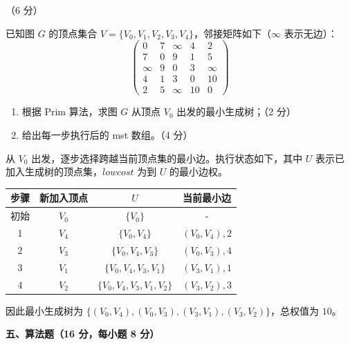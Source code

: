 \begin{question}[Prim算法求最小生成树]（6 分）

已知图 $G$ 的顶点集合 $V=\{V_0,V_1,V_2,V_3,V_4\}$，邻接矩阵如下（$\infty$ 表示无边）：
\[
\begin{pmatrix}
0 & 7 & \infty & 4 & 2\\
7 & 0 & 9 & 1 & 5\\
\infty & 9 & 0 & 3 & \infty\\
4 & 1 & 3 & 0 & 10\\
2 & 5 & \infty & 10 & 0
\end{pmatrix}
\]

\begin{enumerate}[label=\arabic*)]
  \item 根据 Prim 算法，求图 $G$ 从顶点 $V_0$ 出发的最小生成树；（2 分）
  \item 给出每一步执行后的 mst 数组。（4 分）
\end{enumerate}

\begin{solution}
从 $V_0$ 出发，逐步选择跨越当前顶点集的最小边。执行状态如下，其中 $U$ 表示已加入生成树的顶点集，$lowcost$ 为到 $U$ 的最小边权。
\begin{center}
\small
\begin{tabular}{c c c c}
\toprule
步骤 & 新加入顶点 & $U$ & 当前最小边 \\ 
\midrule
初始 & $V_0$ & $\{V_0\}$ & - \\ 
1 & $V_4$ & $\{V_0,V_4\}$ & $(V_0,V_4),2$ \\ 
2 & $V_3$ & $\{V_0,V_4,V_3\}$ & $(V_0,V_3),4$ \\ 
3 & $V_1$ & $\{V_0,V_4,V_3,V_1\}$ & $(V_3,V_1),1$ \\ 
4 & $V_2$ & $\{V_0,V_4,V_3,V_1,V_2\}$ & $(V_3,V_2),3$ \\ 
\bottomrule
\end{tabular}
\end{center}
因此最小生成树为 $\{(V_0,V_4),(V_0,V_3),(V_3,V_1),(V_3,V_2)\}$，总权值为 $10$。
\end{solution}
\end{question}

\textbf{五、算法题（16 分，每小题 8 分）}


